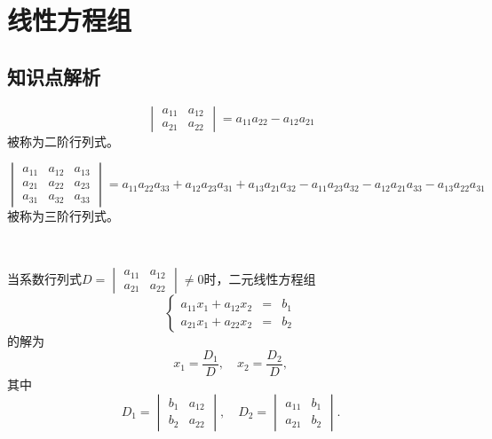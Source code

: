 \chapter{线性方程组}

\section{知识点解析}

\begin{Def}[二阶行列式]
$$\begin{vmatrix} a_{11} & a_{12} \\ a_{21} & a_{22} \end{vmatrix} = a_{11}a_{22} - a_{12}a_{21}$$
被称为二阶行列式。
\end{Def}

\begin{Def}[三阶行列式]
$$\begin{vmatrix} a_{11} & a_{12} & a_{13} \\ a_{21} & a_{22} & a_{23} \\ a_{31} & a_{32} & a_{33} \end{vmatrix} = a_{11}a_{22}a_{33} + a_{12}a_{23}a_{31} + a_{13}a_{21}a_{32} - a_{11}a_{23}a_{32} - a_{12}a_{21}a_{33} - a_{13}a_{22}a_{31}$$
被称为三阶行列式。
\end{Def}

\begin{prop}[含参二元一次方程组的解]\

当系数行列式$D = \begin{vmatrix} a_{11} & a_{12} \\ a_{21} & a_{22} \end{vmatrix} \neq 0$时，二元线性方程组
$$\left\{ \begin{array}{rcl} a_{11}x_1 + a_{12}x_2 & = & b_1 \\ a_{21}x_1 + a_{22}x_2 & = & b_2 \end{array}\right.$$
的解为
$$x_1 = \frac{D_1}{D}, \quad x_2 = \frac{D_2}{D},$$
其中
$$D_1 = \begin{vmatrix} b_1 & a_{12} \\ b_2 & a_{22} \end{vmatrix}, \quad D_2 = \begin{vmatrix} a_{11} & b_1 \\ a_{21} & b_2 \end{vmatrix}.$$
\end{prop}

